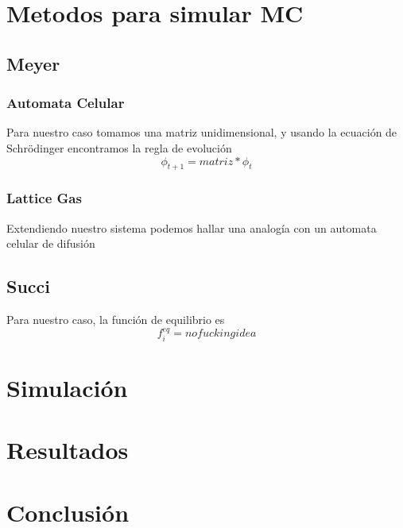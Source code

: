 \documentclass[12pts]{article}
\begin{document}
\section{Metodos para simular MC}

\subsection{Meyer}
\subsubsection{Automata Celular}
 Para nuestro 
caso tomamos una matriz unidimensional, y usando la ecuación de Schrödinger encontramos la 
regla de evolución 
\begin{equation}\label{eq:evolution}
    \phi_{t+1} = matriz*\phi_t
\end{equation}
\subsubsection{Lattice Gas}
Extendiendo nuestro sistema podemos hallar una analogía con un automata celular de difusión

\subsection{Succi}
 Para nuestro caso, la función de equilibrio es
\begin{equation*}
	f_i^{eq} = nofuckingidea
\end{equation*}

\section{Simulación}
\section{Resultados}
\section{Conclusión}
\end{document}
